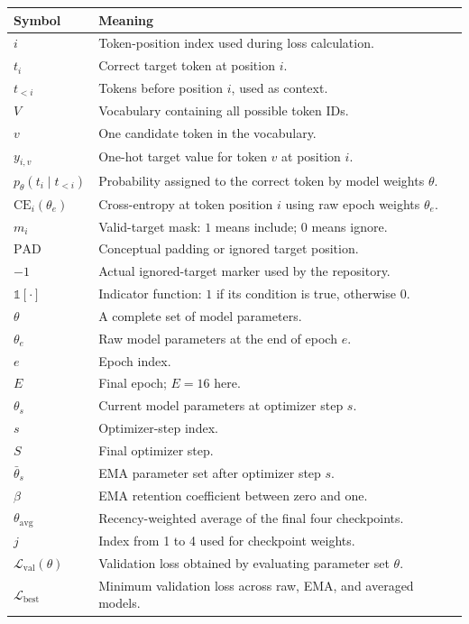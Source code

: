 \documentclass[11pt,a4paper]{article}
\begin{document}
\begin{longtable}{>{\raggedright\arraybackslash}p{}
                  >{\raggedright\arraybackslash}p{}}
  \toprule
  \textbf{Symbol} & \textbf{Meaning} \\
  \midrule
  \endhead
  $i$ & Token-position index used during loss calculation. \\
  $t_i$ & Correct target token at position $i$. \\
  $t_{<i}$ & Tokens before position $i$, used as context. \\
  $V$ & Vocabulary containing all possible token IDs. \\
  $v$ & One candidate token in the vocabulary. \\
  $y_{i,v}$ & One-hot target value for token $v$ at position $i$. \\
  $p_\theta(t_i\mid t_{<i})$ & Probability assigned to the correct token by model weights $\theta$. \\
  $\mathrm{CE}_i(\theta_e)$ & Cross-entropy at token position $i$ using raw epoch weights $\theta_e$. \\
  $m_i$ & Valid-target mask: $1$ means include; $0$ means ignore. \\
  $\mathrm{PAD}$ & Conceptual padding or ignored target position. \\
  $-1$ & Actual ignored-target marker used by the repository. \\
  $\mathbb{1}[\cdot]$ & Indicator function: $1$ if its condition is true, otherwise $0$. \\
  $\theta$ & A complete set of model parameters. \\
  $\theta_e$ & Raw model parameters at the end of epoch $e$. \\
  $e$ & Epoch index. \\
  $E$ & Final epoch; $E=16$ here. \\
  $\theta_s$ & Current model parameters at optimizer step $s$. \\
  $s$ & Optimizer-step index. \\
  $S$ & Final optimizer step. \\
  $\bar\theta_s$ & EMA parameter set after optimizer step $s$. \\
  $\beta$ & EMA retention coefficient between zero and one. \\
  $\theta_{\mathrm{avg}}$ & Recency-weighted average of the final four checkpoints. \\
  $j$ & Index from 1 to 4 used for checkpoint weights. \\
  $\mathcal{L}_{\mathrm{val}}(\theta)$ & Validation loss obtained by evaluating parameter set $\theta$. \\
  $\mathcal{L}_{\mathrm{best}}$ & Minimum validation loss across raw, EMA, and averaged models. \\
  \bottomrule
\end{longtable}
\end{document}
